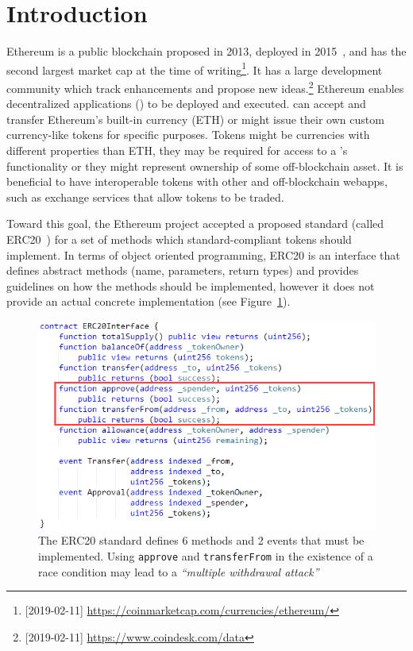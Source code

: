 
\section{Introduction}


Ethereum is a public blockchain proposed in 2013, deployed in 2015~\cite{Ref00}, and has the second largest market cap at the time of writing\footnote{[2019-02-11] \url{https://coinmarketcap.com/currencies/ethereum/}}. It has a large development community which track enhancements and propose new ideas.\footnote{[2019-02-11] \url{https://www.coindesk.com/data}} Ethereum enables decentralized applications (\dapps) to be deployed and executed. \dapps can accept and transfer Ethereum's built-in currency (ETH) or might issue their own custom currency-like tokens for specific purposes. Tokens might be currencies with different properties than ETH, they may be required for access to a \dapp's functionality or they might represent ownership of some off-blockchain asset. It is beneficial to have interoperable tokens with other \dapps and off-blockchain webapps, such as exchange services that allow tokens to be traded.

Toward this goal, the Ethereum project accepted a proposed standard (called ERC20~\cite{Ref08}) for a set of methods which standard-compliant tokens should implement. In terms of object oriented programming, ERC20 is an interface that defines abstract methods (name, parameters, return types) and provides guidelines on how the methods should be implemented, however it does not provide an actual concrete implementation (see Figure~\ref{fig:erc20api}). 

\begin{figure}[t!]
	\centering
	\includegraphics[width=1.0\linewidth]{figures/multiple_withdrawal_01.png}
	\caption{The ERC20 standard defines 6 methods and 2 events that must be implemented. Using \texttt{approve} and \texttt{transferFrom} in the existence of a race condition may lead to a \textit{``multiple withdrawal attack''}\label{fig:erc20api}}
\end{figure}

